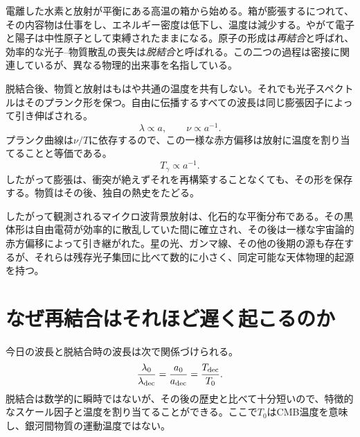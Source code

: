 電離した水素と放射が平衡にある高温の箱から始める。箱が膨張するにつれて、その内容物は仕事をし、エネルギー密度は低下し、温度は減少する。やがて電子と陽子は中性原子として束縛されたままになる。原子の形成は\emph{再結合}と呼ばれ、効率的な光子--物質散乱の喪失は\emph{脱結合}と呼ばれる。この二つの過程は密接に関連しているが、異なる物理的出来事を名指している。

脱結合後、物質と放射はもはや共通の温度を共有しない。それでも光子スペクトルはそのプランク形を保つ。自由に伝播するすべての波長は同じ膨張因子によって引き伸ばされる。
\begin{equation}
\lambda\propto a,
\qquad
\nu\propto a^{-1}.
\end{equation}
プランク曲線は\(\nu/T\)に依存するので、この一様な赤方偏移は放射に温度を割り当てることと等価である。
\begin{equation}
\boxed{T_\gamma\propto a^{-1}.}
\label{eq:c07-temperature-scaling}
\end{equation}
したがって膨張は、衝突が絶えずそれを再構築することなくても、その形を保存する。物質はその後、独自の熱史をたどる。

したがって観測されるマイクロ波背景放射は、化石的な平衡分布である。その黒体形は自由電荷が効率的に散乱していた間に確立され、その後は一様な宇宙論的赤方偏移によって引き継がれた。星の光、ガンマ線、その他の後期の源も存在するが、それらは残存光子集団に比べて数的に小さく、同定可能な天体物理的起源を持つ。

\begin{classroomqa}
\end{classroomqa}

\section{なぜ再結合はそれほど遅く起こるのか}

今日の波長と脱結合時の波長は次で関係づけられる。
\begin{equation}
\frac{\lambda_0}{\lambda_{\rm dec}}
=
\frac{a_0}{a_{\rm dec}}
=
\frac{T_{\rm dec}}{T_0}.
\label{eq:c07-decoupling-ratio}
\end{equation}
脱結合は数学的に瞬時ではないが、その後の歴史と比べて十分短いので、特徴的なスケール因子と温度を割り当てることができる。ここで\(T_0\)はCMB温度を意味し、銀河間物質の運動温度ではない。

